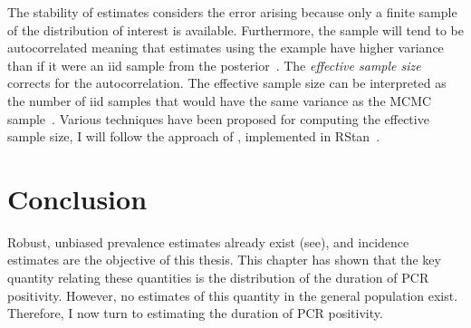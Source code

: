 \documentclass[thesis.tex]{subfiles}
\begin{document}
The stability of estimates considers the error arising because only a finite sample of the distribution of interest is available.
Furthermore, the sample will tend to be autocorrelated meaning that estimates using the example have higher variance than if it were an iid sample from the posterior~\autocite[286]{gelmanBDA}.
The \emph{effective sample size} corrects for the autocorrelation.
The effective sample size can be interpreted as the number of iid samples that would have the same variance as the MCMC sample~\autocites[286]{gelmanBDA}{vehtariRhat}.
Various techniques have been proposed for computing the effective sample size, I will follow the approach of \textcite{vehtariRhat}, implemented in RStan~\autocite{RStan-2-32-3}.

\section{Conclusion} \label{inc-prev:sec:conclusion}

Robust, unbiased prevalence estimates already exist (see), and incidence estimates are the objective of this thesis.
This chapter has shown that the key quantity relating these quantities is the distribution of the duration of PCR positivity.
However, no estimates of this quantity in the general population exist.
Therefore, I now turn to estimating the duration of PCR positivity.

\ifSubfilesClassLoaded{
  \listoftodos
}{}
\end{document}
